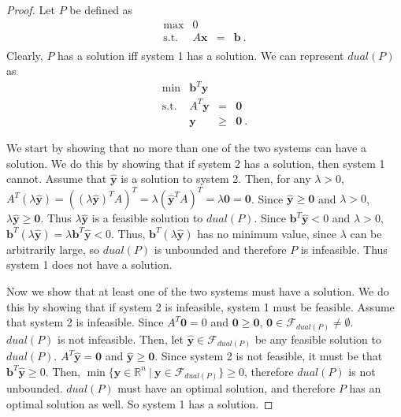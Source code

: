 \documentclass{article}
\begin{document}
\begin{proof}

Let $P$ be defined as
\[
\begin{array}{rrcl}
 \max & 0\\
 \mbox{s.t.}  &  A \mathbf{x}  & = & \mathbf{b}~.\\
\end{array}
\]
Clearly, $P$ has a solution iff system 1 has a solution. We can represent $dual(P)$ as
\[
\begin{array}{rrcl}
 \min & \mathbf{b}^T \mathbf{y}\\
 \mbox{s.t.}  &  A^T \mathbf{y}  & = & \mathbf{0}~ \\
 &   \mathbf{y}  & \ge & \mathbf{0}~.
\end{array}
\]

We start by showing that no more than one of the two systems can have a solution. We do this by showing that if system 2 has a solution, then system 1 cannot. Assume that $\hat{\mathbf{y}}$ is a solution to system 2. Then, for any $\lambda > 0$, $A^T (\lambda \hat{\mathbf{y}}) = ((\lambda \hat{\mathbf{y}})^TA)^T = \lambda (\hat{\mathbf{y}}^T A)^T = \lambda \mathbf{0} = \mathbf{0}$. Since $\hat{\mathbf{y}} \ge \mathbf{0}$ and $\lambda > 0$, $\lambda \hat{\mathbf{y}} \ge \mathbf{0}$. Thus $\lambda \hat{\mathbf{y}}$ is a feasible solution to $dual(P)$. Since $\mathbf{b}^T \hat{\mathbf{y}} < 0$ and $\lambda > 0$, $\mathbf{b}^T (\lambda \hat{\mathbf{y}}) = \lambda \mathbf{b}^T \hat{\mathbf{y}} < 0$. Thus, $\mathbf{b}^T (\lambda \hat{\mathbf{y}})$ has no minimum value, since $\lambda$ can be arbitrarily large, so $dual(P)$ is unbounded and therefore $P$ is infeasible. Thus system 1 does not have a solution.

Now we show that at least one of the two systems must have a solution. We do this by showing that if system 2 is infeasible, system 1 must be feasible. Assume that system 2 is infeasible. Since $A^T \mathbf{0} = 0$ and $\mathbf{0} \ge \mathbf{0}$, $\mathbf{0} \in \mathcal{F}_{dual(P)} \ne \emptyset$. $dual(P)$ is not infeasible. Then, let $\hat{\mathbf{y}} \in \mathcal{F}_{dual(P)}$ be any feasible solution to $dual(P)$. $A^T \hat{\mathbf{y}} = \mathbf{0}$ and $\hat{\mathbf{y}} \ge \mathbf{0}$. Since system 2 is not feasible, it must be that $\mathbf{b}^T \hat{\mathbf{y}} \ge 0$. Then, $\min \{\mathbf{y} \in \mathbb{R}^n ~|~ \mathbf{y} \in \mathcal{F}_{dual(P)}\} \ge 0$, therefore $dual(P)$ is not unbounded. $dual(P)$ must have an optimal solution, and therefore $P$ has an optimal solution as well. So system 1 has a solution.

\end{proof}
\end{document}
